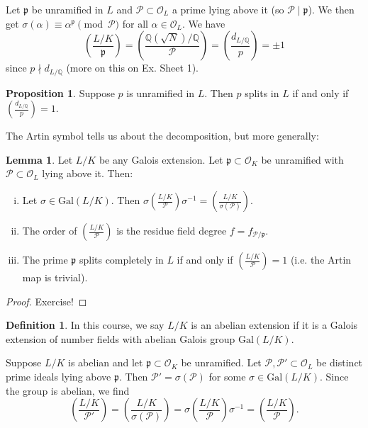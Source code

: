 \documentclass{article}
\theoremstyle{definition}
\newtheorem{lemma}[theorem]{Lemma}
\newtheorem{prop}[theorem]{Proposition}
\newtheorem{defn}{Definition}[section]
\begin{document}
Let $\mathfrak{p}$ be unramified in $L$ and $\mathcal{P} \subset \mathcal{O}_L$ a prime lying above it (so $\mathcal{P} \mid \mathfrak{p}$). We then get $\sigma(\alpha) \equiv \alpha^{\mathfrak{p}} \pmod{\mathcal{P}}$ for all $\alpha \in \mathcal{O}_L$. We have \[
\left(\frac{L/K}{\mathfrak{p}}\right) = \left(\frac{\mathbb{Q}(\sqrt{N})/\mathbb{Q}}{\mathcal{P}}\right) = \left(\frac{d_{L/\mathbb{Q}}}{p}\right) = \pm 1
\]
since $p \nmid d_{L/\mathbb{Q}}$ (more on this on Ex. Sheet 1).
\begin{prop}
    Suppose $p$ is unramified in $L$. Then $p$ splits in $L$ if and only if $\left(\frac{d_{L/\mathbb{Q}}}{p}\right) = 1$.
\end{prop}
The Artin symbol tells us about the decomposition, but more generally:
\begin{lemma}
    Let $L/K$ be any Galois extension. Let $\mathfrak{p} \subset \mathcal{O}_K$ be unramified with $\mathcal{P} \subset \mathcal{O}_L$ lying above it. Then:
    \begin{enumerate}[(i)]
        \item Let $\sigma \in \text{Gal}(L/K)$. Then $\sigma \left(\frac{L/K}{\mathcal{P}}\right)\sigma^{-1} = \left(\frac{L/K}{\sigma(\mathcal{P})}\right)$.
        \item The order of $\left(\frac{L/K}{\mathcal{P}}\right)$ is the residue field degree $f = f_{\mathcal{P}/\mathfrak{p}}$.
        \item The prime $\mathfrak{p}$ splits completely in $L$ if and only if $\left(\frac{L/K}{\mathcal{P}}\right) = 1$ (i.e. the Artin map is trivial).
    \end{enumerate}
\end{lemma}
\begin{proof}
    Exercise!
\end{proof}
\begin{defn}
    In this course, we say $L/K$ is an abelian extension if it is a Galois extension of number fields with abelian Galois group $\text{Gal}(L/K)$.
\end{defn}
Suppose $L/K$ is abelian and let $\mathfrak{p} \subset \mathcal{O}_K$ be unramified. Let $\mathcal{P}, \mathcal{P}' \subset \mathcal{O}_L$ be distinct prime ideals lying above $\mathfrak{p}$. Then $\mathcal{P}' = \sigma(\mathcal{P})$ for some $\sigma \in \text{Gal}(L/K)$. Since the group is abelian, we find
\[
\left(\frac{L/K}{\mathcal{P}'}\right) = \left(\frac{L/K}{\sigma(\mathcal{P})}\right) = \sigma\left(\frac{L/K}{\mathcal{P}}\right)\sigma^{-1} = \left(\frac{L/K}{\mathcal{P}}\right).
\]
\end{document}
